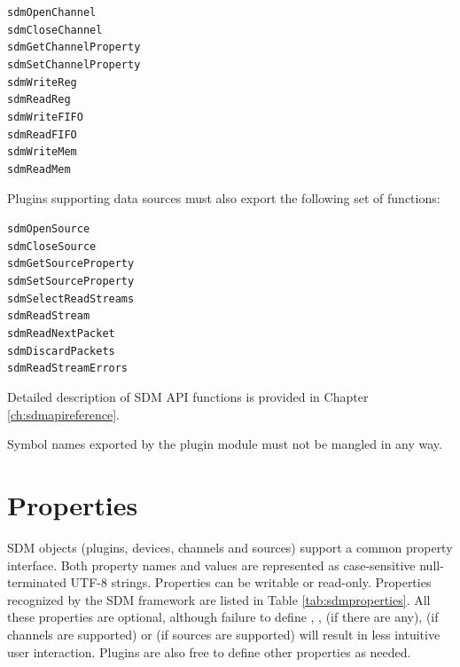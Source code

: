 \documentclass[a4paper,12pt,twoside,extrafontsizes]{memoir}
\begin{document}
\begin{alltt}
	sdmOpenChannel
	sdmCloseChannel
	sdmGetChannelProperty
	sdmSetChannelProperty
	sdmWriteReg
	sdmReadReg
	sdmWriteFIFO
	sdmReadFIFO
	sdmWriteMem
	sdmReadMem
\end{alltt}

Plugins supporting data sources must also export the following set of functions:

\begin{alltt}
	sdmOpenSource
	sdmCloseSource
	sdmGetSourceProperty
	sdmSetSourceProperty
	sdmSelectReadStreams
	sdmReadStream
	sdmReadNextPacket
	sdmDiscardPackets
	sdmReadStreamErrors
\end{alltt}

Detailed description of SDM API functions is provided in Chapter \ref{ch:sdmapireference}.

Symbol names exported by the plugin module must not be mangled in any way.

\section{Properties}
\label{sec:properties}

SDM objects (plugins, devices, channels and sources) support a common property interface. Both property names and values are represented as case-sensitive null-terminated UTF-8 strings. Properties can be writable or read-only. Properties recognized by the SDM framework are listed in Table \ref{tab:sdmproperties}. All these properties are optional, although failure to define , ,  (if there are any),  (if channels are supported) or  (if sources are supported) will result in less intuitive  user interaction. Plugins are also free to define other properties as needed.
\end{document}
